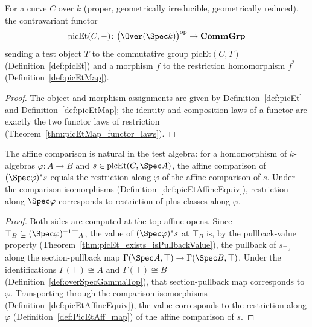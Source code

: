 \begin{definition}
  \label{def:picEtFunctor}
  \leanok
  For a curve \(C\) over \(k\) (proper, geometrically irreducible, geometrically reduced), the
  contravariant functor
  \[
    \mathrm{picEt}(C, -) \colon \bigl(\Over(\Spec k)\bigr)^{\mathrm{op}} \to \mathbf{CommGrp}
  \]
  sending a test object \(T\) to the commutative group \(\mathrm{picEt}(C, T)\)
  (Definition~\ref{def:picEt}) and a morphism \(f\) to the restriction homomorphism \(f^{*}\)
  (Definition~\ref{def:picEtMap}).
\end{definition}
\begin{proof}
  \leanok
  The object and morphism assignments are given by Definition~\ref{def:picEt} and
  Definition~\ref{def:picEtMap}; the identity and composition laws of a functor are exactly the two
  functor laws of restriction (Theorem~\ref{thm:picEtMap_functor_laws}).
\end{proof}

\begin{theorem}
  \label{thm:picEtAffineEquiv_naturality}
  \leanok
  The affine comparison is natural in the test algebra: for a homomorphism of \(k\)-algebras
  \(\varphi \colon A \to B\) and \(s \in \mathrm{picEt}(C, \Spec A)\), the affine comparison of
  \((\Spec\varphi)^{*}s\) equals the restriction along \(\varphi\) of the affine comparison of
  \(s\). Under the comparison isomorphisms (Definition~\ref{def:picEtAffineEquiv}), restriction along
  \(\Spec\varphi\) corresponds to restriction of plus classes along \(\varphi\).
\end{theorem}
\begin{proof}
  \leanok
  Both sides are computed at the top affine opens. Since \(\top_B \subseteq (\Spec\varphi)^{-1}
  \top_A\), the value of \((\Spec\varphi)^{*}s\) at \(\top_B\) is, by the pullback-value property
  (Theorem~\ref{thm:picEt_exists_isPullbackValue}), the pullback of \(s_{\top_A}\) along the
  section-pullback map \(\Gamma(\Spec A, \top) \to \Gamma(\Spec B, \top)\). Under the identifications
  \(\Gamma(\top) \cong A\) and \(\Gamma(\top) \cong B\) (Definition~\ref{def:overSpecGammaTop}), that
  section-pullback map corresponds to \(\varphi\). Transporting through the comparison isomorphisms
  (Definition~\ref{def:picEtAffineEquiv}), the value corresponds to the restriction along
  \(\varphi\) (Definition~\ref{def:PicEtAff_map}) of the affine comparison of \(s\).
\end{proof}

